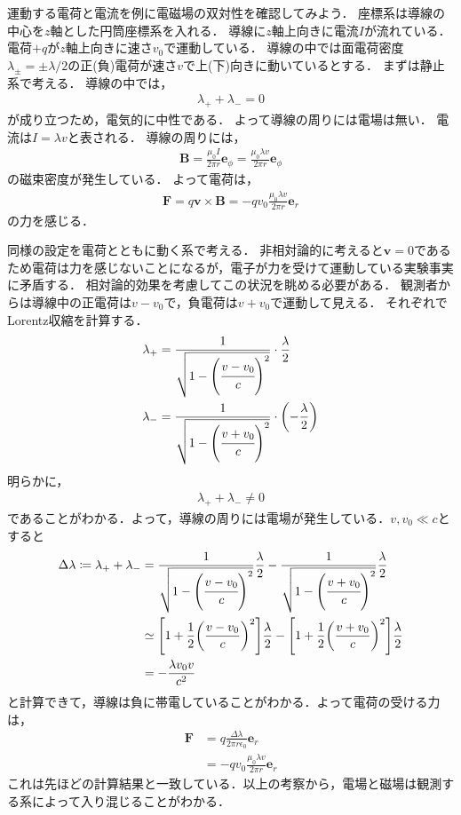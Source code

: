 \documentclass{report}
\begin{document}
    \begin{myex}{}{}
      運動する電荷と電流を例に電磁場の双対性を確認してみよう．
      座標系は導線の中心を$z$軸とした円筒座標系を入れる．
      導線に$z$軸上向きに電流$I$が流れている．
      電荷$+q$が$z$軸上向きに速さ$v_0$で運動している．
      導線の中では面電荷密度$\lambda_{\pm} = \pm\lambda/2$の正(負)電荷が速さ$v$で上(下)向きに動いているとする．
      まずは静止系で考える．
      導線の中では，
      \begin{align}
        \lambda_{+} + \lambda_{-} = 0
      \end{align}
      が成り立つため，電気的に中性である．
      よって導線の周りには電場は無い．
      電流は$I = \lambda v$と表される．
      導線の周りには，
      \begin{align}
        \bm{B} = \frac{\mu_0I}{2\pi r} \bm{e}_{\phi} = \frac{\mu_0 \lambda v}{2\pi r} \bm{e}_{\phi}
      \end{align}
      の磁束密度が発生している．
      よって電荷は，
      \begin{align}
        \bm{F} = q\bm{v}\times\bm{B} = -qv_0\frac{\mu_0 \lambda v}{2\pi r}\bm{e}_r
      \end{align}
      の力を感じる．
      \par
      同様の設定を電荷とともに動く系で考える．
      非相対論的に考えると$\bm{v} = 0$であるため電荷は力を感じないことになるが，電子が力を受けて運動している実験事実に矛盾する．
      相対論的効果を考慮してこの状況を眺める必要がある．
      観測者からは導線中の正電荷は$v - v_0$で，負電荷は$v + v_0$で運動して見える．
      それぞれでLorentz収縮を計算する．
      \begin{align}
        \lambda_{+} &= \frac{1}{\sqrt{1-\qty(\cfrac{v - v_0}{c})^2}} \cdot \frac{\lambda}{2}\\
        \lambda_{-} &= \frac{1}{\sqrt{1-\qty(\cfrac{v + v_0}{c})^2}} \cdot \qty(-\frac{\lambda}{2})
      \end{align}
      明らかに，
      \begin{align}
        \lambda_{+} + \lambda_{-} \neq 0
      \end{align}
      であることがわかる．よって，導線の周りには電場が発生している．$v,v_0 \ll c$とすると
      \begin{align}
        \Delta \lambda \coloneqq \lambda_{+} + \lambda_{-} &= \frac{1}{\sqrt{1 - \qty(\cfrac{v - v_0}{c})^2}}\frac{\lambda}{2} - \frac{1}{\sqrt{1 - \qty(\cfrac{v + v_0}{c})^2}}\frac{\lambda}{2}\\
        &\simeq \qty[1 + \frac{1}{2}\qty(\frac{v - v_0}{c})^2]\frac{\lambda}{2} - \qty[1 + \frac{1}{2}\qty(\frac{v + v_0}{c})^2]\frac{\lambda}{2}\\
        &= - \frac{\lambda v_0 v}{c^2} 
      \end{align}
      と計算できて，導線は負に帯電していることがわかる．よって電荷の受ける力は，
      \begin{align}
        \bm{F} &= q\frac{\Delta \lambda}{2\pi r \epsilon_0}\bm{e}_r\\
        &= -qv_0\frac{\mu_0 \lambda v}{2\pi r}\bm{e}_r
      \end{align}
      これは先ほどの計算結果と一致している．以上の考察から，電場と磁場は観測する系によって入り混じることがわかる．
    \end{myex}
\end{document}
